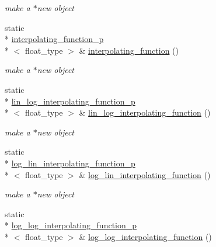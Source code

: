 \begin{DoxyCompactItemize}
\begin{DoxyCompactList}\small\item\em make a $\ast$new object \end{DoxyCompactList}\item 
\hypertarget{classc2__factory_ab43eaad040801a28019b917c4195b8d5}{static \\*
\hyperlink{classinterpolating__function__p}{interpolating\-\_\-function\-\_\-p}\\*
$<$ float\-\_\-type $>$ \& \hyperlink{classc2__factory_ab43eaad040801a28019b917c4195b8d5}{interpolating\-\_\-function} ()}\label{classc2__factory_ab43eaad040801a28019b917c4195b8d5}

\begin{DoxyCompactList}\small\item\em make a $\ast$new object \end{DoxyCompactList}\item 
\hypertarget{classc2__factory_ab3e9ddf591f0cb2d327dc02c41836232}{static \\*
\hyperlink{classlin__log__interpolating__function__p}{lin\-\_\-log\-\_\-interpolating\-\_\-function\-\_\-p}\\*
$<$ float\-\_\-type $>$ \& \hyperlink{classc2__factory_ab3e9ddf591f0cb2d327dc02c41836232}{lin\-\_\-log\-\_\-interpolating\-\_\-function} ()}\label{classc2__factory_ab3e9ddf591f0cb2d327dc02c41836232}

\begin{DoxyCompactList}\small\item\em make a $\ast$new object \end{DoxyCompactList}\item 
\hypertarget{classc2__factory_afecb73857f9c060b6e32be187705b573}{static \\*
\hyperlink{classlog__lin__interpolating__function__p}{log\-\_\-lin\-\_\-interpolating\-\_\-function\-\_\-p}\\*
$<$ float\-\_\-type $>$ \& \hyperlink{classc2__factory_afecb73857f9c060b6e32be187705b573}{log\-\_\-lin\-\_\-interpolating\-\_\-function} ()}\label{classc2__factory_afecb73857f9c060b6e32be187705b573}

\begin{DoxyCompactList}\small\item\em make a $\ast$new object \end{DoxyCompactList}\item 
\hypertarget{classc2__factory_a18b0897567e472e50290fcb1834176d3}{static \\*
\hyperlink{classlog__log__interpolating__function__p}{log\-\_\-log\-\_\-interpolating\-\_\-function\-\_\-p}\\*
$<$ float\-\_\-type $>$ \& \hyperlink{classc2__factory_a18b0897567e472e50290fcb1834176d3}{log\-\_\-log\-\_\-interpolating\-\_\-function} ()}\label{classc2__factory_a18b0897567e472e50290fcb1834176d3}


\end{DoxyCompactItemize}
